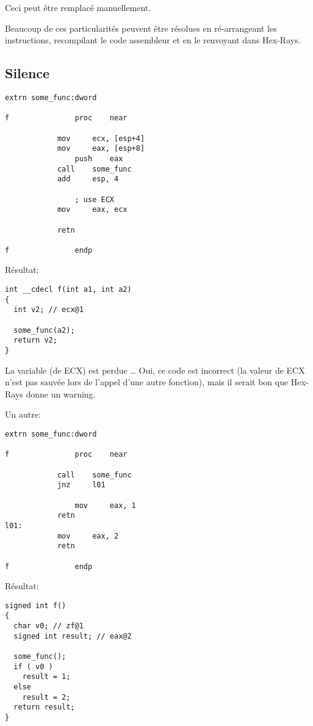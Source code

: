Ceci peut être remplacé manuellement.

Beaucoup de ces particularités peuvent être résolues en ré-arrangeant les instructions,
recompilant le code assembleur et en le renvoyant dans Hex-Rays.

\subsection{Silence}

\begin{lstlisting}
extrn some_func:dword

f               proc    near

        	mov     ecx, [esp+4]
	        mov     eax, [esp+8]
                push    eax
        	call    some_func
	        add     esp, 4

                ; use ECX
        	mov     eax, ecx

	        retn

f               endp
\end{lstlisting}

Résultat:

\begin{lstlisting}
int __cdecl f(int a1, int a2)
{
  int v2; // ecx@1

  some_func(a2);
  return v2;
}
\end{lstlisting}

La variable  (de ECX) est perdue \dots
Oui, ce code est incorrect (la valeur de ECX n'est pas sauvée lors de l'appel d'une
autre fonction), mais il serait bon que Hex-Rays donne un warning.

Un autre:

\begin{lstlisting}
extrn some_func:dword

f               proc    near

	        call    some_func
        	jnz     l01

                mov     eax, 1
	        retn
l01:
	        mov     eax, 2
        	retn

f               endp
\end{lstlisting}

Résultat:

\begin{lstlisting}
signed int f()
{
  char v0; // zf@1
  signed int result; // eax@2

  some_func();
  if ( v0 )
    result = 1;
  else
    result = 2;
  return result;
}
\end{lstlisting}

